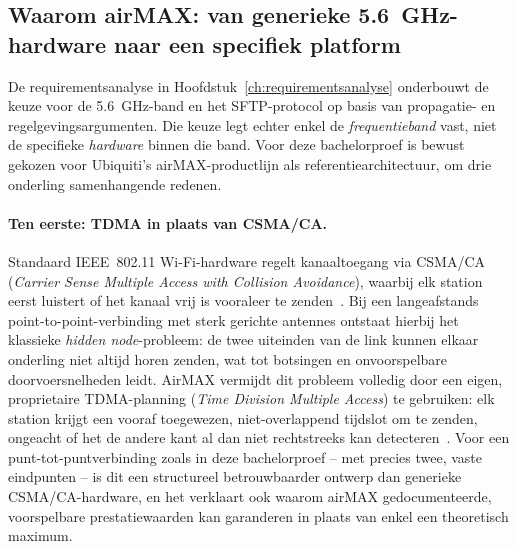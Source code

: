 \subsection{Waarom airMAX: van generieke 5.6~GHz-hardware naar een specifiek platform}%
\label{subsec:meth-airmax-keuze}

De requirementsanalyse in Hoofdstuk~\ref{ch:requirementsanalyse} onderbouwt de keuze
voor de 5.6~GHz-band en het SFTP-protocol op basis van propagatie- en
regelgevingsargumenten. Die keuze legt echter enkel de \emph{frequentieband} vast, niet
de specifieke \emph{hardware} binnen die band. Voor deze bachelorproef is bewust
gekozen voor Ubiquiti's airMAX-productlijn als referentiearchitectuur, om drie
onderling samenhangende redenen.

\paragraph{Ten eerste: TDMA in plaats van CSMA/CA.} Standaard IEEE~802.11 Wi-Fi-hardware
regelt kanaaltoegang via CSMA/CA (\textit{Carrier Sense Multiple Access with Collision
Avoidance}), waarbij elk station eerst luistert of het kanaal vrij is vooraleer te
zenden~\autocite{Tanenbaum2021}. Bij een langeafstands point-to-point-verbinding met
sterk gerichte antennes ontstaat hierbij het klassieke \textit{hidden node}-probleem: de
twee uiteinden van de link kunnen elkaar onderling niet altijd horen zenden, wat tot
botsingen en onvoorspelbare doorvoersnelheden leidt. AirMAX vermijdt dit probleem
volledig door een eigen, proprietaire TDMA-planning (\textit{Time Division Multiple
Access}) te gebruiken: elk station krijgt een vooraf toegewezen, niet-overlappend
tijdslot om te zenden, ongeacht of het de andere kant al dan niet rechtstreeks kan
detecteren~\autocite{AirMaxTDMA}. Voor een punt-tot-puntverbinding zoals in deze
bachelorproef -- met precies twee, vaste eindpunten -- is dit een structureel
betrouwbaarder ontwerp dan generieke CSMA/CA-hardware, en het verklaart ook waarom
airMAX gedocumenteerde, voorspelbare prestatiewaarden kan garanderen in plaats van enkel
een theoretisch maximum.

